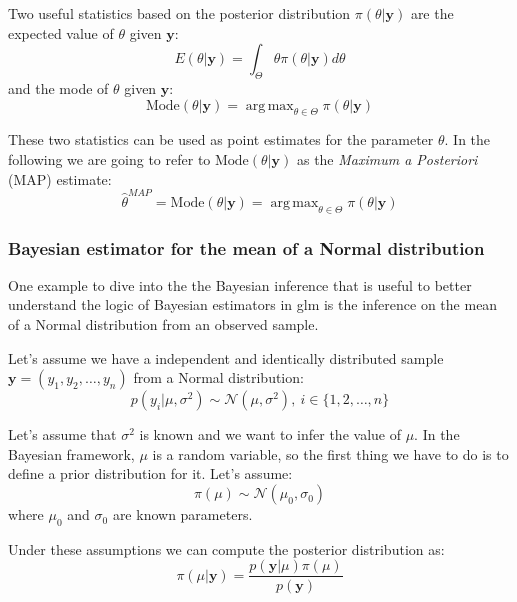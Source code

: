 \documentclass[a4paper, twoside, openright, 12pt]{report}
\DeclareMathOperator*{\argmax}{arg\,max}  %
\theoremstyle{definition}
\theoremstyle{definition}
\theoremstyle{definition}
\theoremstyle{remark}
\begin{document}
Two useful statistics based on the posterior distribution \(\pi(\theta|\boldsymbol{y})\) are the expected value of \(\theta\) given \(\boldsymbol{y}\):
\[
E(\theta|\boldsymbol{y}) = \int_{\Theta}{\theta \pi(\theta|\boldsymbol{y}) d\theta}
\]
and the mode of \(\theta\) given \(\boldsymbol{y}\):
\[
\text{Mode}(\theta|\boldsymbol{y}) = \argmax_{\theta\in\Theta}{\pi(\theta|\boldsymbol{y})}
\]

These two statistics can be used as point estimates for the parameter \(\theta\). In the following we are going to refer to \(\text{Mode}(\theta|\boldsymbol{y})\) as the \emph{Maximum a Posteriori} (MAP) estimate:
\[
\hat{\theta}^{MAP} = \text{Mode}(\theta|\boldsymbol{y}) = \argmax_{\theta\in\Theta}{\pi(\theta|\boldsymbol{y})}
\]

\hypertarget{bayesian-estimator-for-the-mean-of-a-normal-distribution}{%
\subsubsection{Bayesian estimator for the mean of a Normal distribution}\label{bayesian-estimator-for-the-mean-of-a-normal-distribution}}

One example to dive into the the Bayesian inference that is useful to better understand the logic of Bayesian estimators in \ac{glm} is the inference on the mean of a Normal distribution from an observed sample.

Let's assume we have a independent and identically distributed sample \(\boldsymbol{y} = (y_1, y_2, \dots, y_n)\) from a Normal distribution:
\begin{equation}
\label{eq:bayes-normal-normal-likelihood}
p(y_i | \mu, \sigma^2) \sim \mathcal{N}(\mu, \sigma^2), \ i\in\{1,2,\dots,n\}
\end{equation}

Let's assume that \(\sigma^2\) is known and we want to infer the value of \(\mu\). In the Bayesian framework, \(\mu\) is a random variable, so the first thing we have to do is to define a prior distribution for it. Let's assume:
\begin{equation}
\label{eq:bayes-normal-normal-prior}
\pi(\mu) \sim \mathcal{N}(\mu_0, \sigma_0)
\end{equation}
where \(\mu_0\) and \(\sigma_0\) are known parameters.

Under these assumptions we can compute the posterior distribution as:
\[
\pi(\mu|\boldsymbol{y}) = \frac{p(\boldsymbol{y}|\mu)\pi(\mu)}{p(\boldsymbol{y})}
\]
\end{document}
